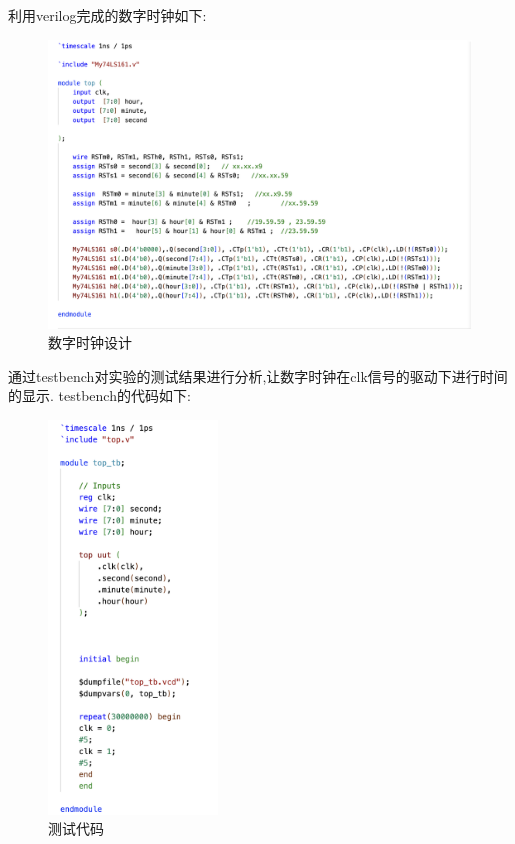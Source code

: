 \documentclass{article}
\begin{document}
利用verilog完成的数字时钟如下:
\begin{figure}[H]
    \centering
    \includegraphics[width=1\textwidth]{2.png}
    \caption{\label{Lab12}数字时钟设计}
    \end{figure}

通过testbench对实验的测试结果进行分析,让数字时钟在clk信号的驱动下进行时间的显示.
testbench的代码如下:
\begin{figure}[H]
\centering
\includegraphics[width=0.4\textwidth]{3.png}
\caption{\label{Lab12}测试代码}
\end{figure}
\end{document}
